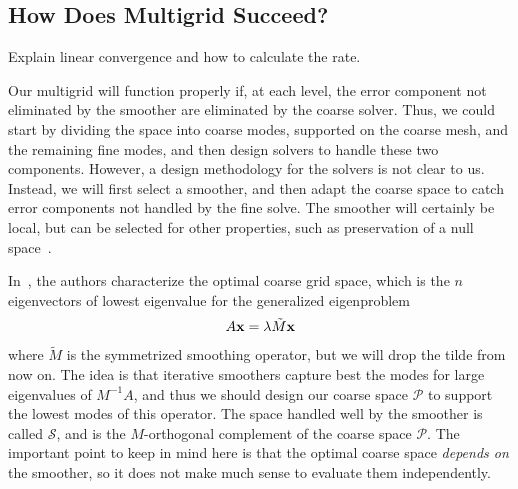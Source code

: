 \begin{refsection}
\chapter{How Does Multigrid Succeed?}\label{ch:success}

Explain linear convergence and how to calculate the rate.

Our multigrid will function properly if, at each level, the error component not eliminated by the smoother are eliminated by the coarse solver. Thus, we could start by dividing the space into coarse modes, supported on the coarse mesh, and the remaining fine modes, and then design solvers to handle these two components. However, a design methodology for the solvers is not clear to us. Instead, we will first select a smoother, and then adapt the coarse space to catch error components not handled by the fine solve. The smoother will certainly be local, but can be selected for other properties, such as preservation of a null space~\parencite{FarrellMitchellWechsung2018,FarrellKnepleyWechsungMitchell2020}.

In~\parencite{BrannickEtAl2018}, the authors characterize the optimal coarse grid space, which is the $n$ eigenvectors of lowest eigenvalue for the generalized eigenproblem
\begin{align}
  A \vb{x} = \lambda \tilde M \vb{x}
\end{align}
where $\tilde M$ is the symmetrized smoothing operator, but we will drop the tilde from now on. The idea is that iterative smoothers capture best the modes for large eigenvalues of $M^{-1} A$, and thus we should design our coarse space $\mathcal{P}$ to support the lowest modes of this operator. The space handled well by the smoother is called $\mathcal{S}$, and is the $M$-orthogonal complement of the coarse space $\mathcal{P}$. The important point to keep in mind here is that the optimal coarse space \textit{depends on} the smoother, so it does not make much sense to evaluate them independently.


\end{refsection}
